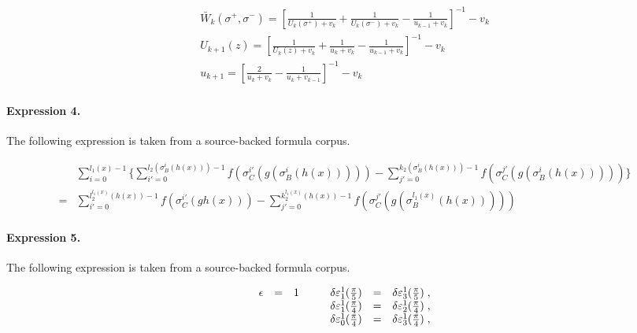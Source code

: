 \documentclass[11pt]{article}
\begin{document}
\begin{align*}\begin{array}{c}\bar W_k(\sigma ^{+},\sigma ^{-})=\left[ \frac 1{U_k(\sigma ^{+})+v_k}+\frac1{U_k(\sigma ^{-})+v_k}-\frac 1{u_{k-1}+v_k}\right] ^{-1}-v_k \\U_{k+1}(z)=\left[ \frac 1{U_k(z)+v_k}+\frac 1{u_k+v_k}-\frac1{u_{k-1}+v_k}\right] ^{-1}-v_k \\u_{k+1}=\left[ \frac 2{u_k+v_k}-\frac 1{u_k+v_{k-1}}\right] ^{-1}-v_k\end{array}\end{align*}

\paragraph{Expression 4.} The following expression is taken from a source-backed formula corpus.

\begin{align*}& \sum_{i=0}^{l_1(x)-1} \{\sum_{i'=0}^{l_2 (\sigma_B^i(h(x)))-1} f(\sigma_C^{i'}(g(\sigma_B^i(h(x)))))-\sum_{j'=0}^{k_2 (\sigma_B^i(h(x)))-1} f(\sigma_C^{j'}(g(\sigma_B^{i}(h(x))))) \}\\=&\sum_{i'=0}^{l_2^{l_1(x)} (h(x))-1} f(\sigma_C^{i'}(gh(x)))-\sum_{j'=0}^{k_2^{l_1(x)}(h(x))-1} f(\sigma_C^{j'}(g(\sigma_B^{l_1(x)}(h(x)))))\end{align*}

\paragraph{Expression 5.} The following expression is taken from a source-backed formula corpus.

\begin{align*}\begin{array}{lcrcl}\epsilon&=&1\hspace{10mm}\delta\varepsilon^{1}_{1}(\frac{\pi}{5})&=&\delta\varepsilon^{1}_{3}(\frac{\pi}{5})\;,\\ &&\delta\varepsilon^{1}_{1}(\frac{\pi}{4})&=&\delta\varepsilon^{1}_{2}(\frac{\pi}{4})\;,\\ &&\delta\varepsilon^{1}_{0}(\frac{\pi}{4})&=&\delta\varepsilon^{1}_{3}(\frac{\pi}{4})\;, \end{array}\end{align*}
\end{document}
